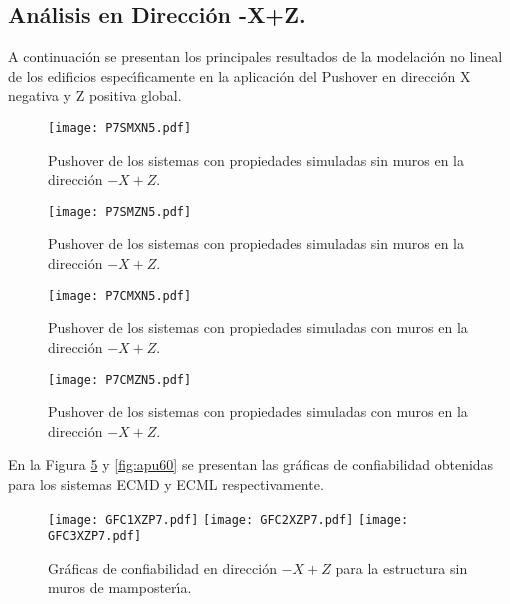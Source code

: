 \paragraph{}

\newpage

\subsection{An\'alisis en Direcci\'on -X+Z.}

A continuaci\'on se presentan los principales resultados de la modelaci\'on no lineal de los edificios espec\'{\i}ficamente en la aplicaci\'on del Pushover en direcci\'on X negativa y Z positiva global.

\begin{figure} [htbp]
\texttt{[image: P7SMXN5.pdf]}
\caption{Pushover de los sistemas con propiedades simuladas sin muros en la direcci\'on $-X+Z$.}
\label{fig:apu55}
\end{figure}

\begin{figure} [htbp]
\texttt{[image: P7SMZN5.pdf]}
\caption{Pushover de los sistemas con propiedades simuladas sin muros en la direcci\'on $-X+Z$.}
\label{fig:apu56}
\end{figure}

\begin{figure} [htbp]
\texttt{[image: P7CMXN5.pdf]}
\caption{Pushover de los sistemas con propiedades simuladas con muros en la direcci\'on $-X+Z$.}
\label{fig:apu57}
\end{figure}

\begin{figure} [htbp]
\texttt{[image: P7CMZN5.pdf]}
\caption{Pushover de los sistemas con propiedades simuladas con muros en la direcci\'on $-X+Z$.}
\label{fig:apu58}
\end{figure}

En la Figura \ref{fig:apu59} y \ref{fig:apu60} se presentan las gr\'aficas de confiabilidad obtenidas para los sistemas ECMD y ECML respectivamente.

\newpage

\begin{figure} [htbp]
\centering
\texttt{[image: GFC1XZP7.pdf]}
\texttt{[image: GFC2XZP7.pdf]}
\texttt{[image: GFC3XZP7.pdf]}
\caption{Gr\'aficas de confiabilidad en direcci\'on $-X+Z$ para la estructura sin muros de mamposter\'{\i}a.}
\label{fig:apu59}
\end{figure}

